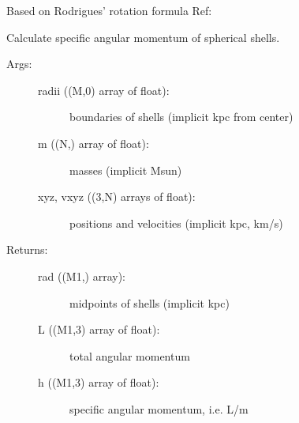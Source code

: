 \documentclass[letterpaper,10pt,english]{sphinxmanual}
\begin{document}
\begin{fulllineitems}
\begin{fulllineitems}
\begin{description}
\end{description}

Based on Rodrigues’ rotation formula
Ref: 

\end{fulllineitems}


\begin{fulllineitems}
\label{\detokenize{centerofmass:galaxy.centerofmass.CenterOfMass.shell_h}}
Calculate specific angular momentum of spherical shells.
\begin{description}
\item[{Args:}] \leavevmode\begin{description}
\item[{radii ((M,0) array of float):}] \leavevmode
boundaries of shells (implicit kpc from center)

\item[{m ((N,) array of float):}] \leavevmode
masses (implicit Msun)

\item[{xyz, vxyz ((3,N) arrays of float):}] \leavevmode
positions and velocities (implicit kpc, km/s)

\end{description}

\item[{Returns:}] \leavevmode\begin{description}
\item[{rad ((M\sphinxhyphen{}1,) array): }] \leavevmode
midpoints of shells (implicit kpc)

\item[{L ((M\sphinxhyphen{}1,3) array of float):}] \leavevmode
total angular momentum

\item[{h ((M\sphinxhyphen{}1,3) array of float):}] \leavevmode
specific angular momentum, i.e. L/m

\end{description}

\end{description}

\end{fulllineitems}



\end{fulllineitems}
\end{document}
